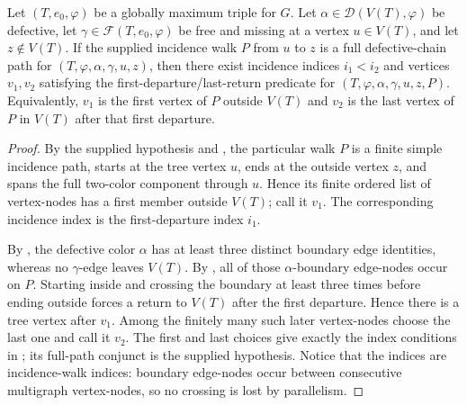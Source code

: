 \begin{lemma}
Let $(T,e_0,\varphi)$ be a globally maximum triple for $G$.  Let
$\alpha\in\mathcal D(V(T),\varphi)$ be defective, let
$\gamma\in\mathcal F(T,e_0,\varphi)$ be free and missing at a vertex
$u\in V(T)$, and let $z\notin V(T)$.  If the supplied incidence walk $P$
from $u$ to $z$ is a full defective-chain path for
$(T,\varphi,\alpha,\gamma,u,z)$, then there exist incidence indices
$i_1<i_2$ and vertices $v_1,v_2$ satisfying the
first-departure/last-return predicate for
$(T,\varphi,\alpha,\gamma,u,z,P)$.  Equivalently, $v_1$ is the first
vertex of $P$ outside $V(T)$ and $v_2$ is the last vertex of $P$ in
$V(T)$ after that first departure.
\end{lemma}
\begin{proof}
By the supplied hypothesis and , the
particular walk $P$ is a finite simple incidence path, starts at the tree
vertex $u$, ends at the outside vertex $z$, and spans the full two-color
component through $u$.  Hence its finite ordered list of vertex-nodes has
a first member outside $V(T)$; call it $v_1$.  The corresponding incidence
index is the first-departure index $i_1$.

By , the defective color
$\alpha$ has at least three distinct boundary edge identities, whereas no
$\gamma$-edge leaves $V(T)$.  By
, all of those
$\alpha$-boundary edge-nodes occur on $P$.  Starting inside and crossing
the boundary at least three times before ending outside forces a return to
$V(T)$ after the first departure.  Hence there is a tree vertex after
$v_1$.  Among the finitely many such later vertex-nodes choose the last
one and call it $v_2$.  The first and last choices give exactly the index
conditions in ; its full-path conjunct is
the supplied hypothesis.  Notice that the indices are incidence-walk
indices: boundary edge-nodes occur between consecutive multigraph
vertex-nodes, so no crossing is lost by parallelism.
\end{proof}
